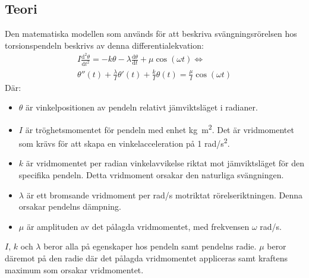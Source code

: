 \documentclass[12pt, a4paper]{article}
\begin{document}
\subsection{Teori}
Den matematiska modellen som används för att beskriva svängningsrörelsen hos torsionspendeln beskrivs av denna differentialekvation:
\begin{equation}
	\begin{split}
		I\frac{\mathrm{d}^2\theta}{\mathrm{d}t^2}=-k\theta-\lambda\frac{\mathrm{d}\theta}{\mathrm{d}t}+\mu\cos(\omega t)\Leftrightarrow\\
		\theta''(t)+\frac{\lambda}{I}\theta'(t)+\frac{k}{I}\theta(t)=\frac{\mu}{I}\cos(\omega t)
	\end{split}
\end{equation}
Där: 
\begin{itemize}
	\item $\theta$ är vinkelpositionen av pendeln relativt jämviktsläget i radianer.
	\item $I$ är tröghetsmomentet för pendeln med enhet \si{kg.m^2}. Det är vridmomentet som krävs för att skapa en vinkelacceleration på 1 \si{rad/s^2}.
	\item $k$ är vridmomentet per radian vinkelavvikelse riktat mot jämviktsläget för den specifika pendeln. Detta vridmoment orsakar den naturliga svängningen.
	\item $\lambda$ är ett bromsande vridmoment per \si{rad/s} motriktat rörelseriktningen. Denna orsakar pendelns dämpning.
	\item $\mu$ är amplituden av det pålagda vridmomentet, med frekvensen $\omega$ \si{rad/s}.
\end{itemize}
$I$, $k$ och $\lambda$ beror alla på egenskaper hos pendeln samt pendelns radie. $\mu$ beror däremot på den radie där det pålagda vridmomentet appliceras samt kraftens maximum som orsakar vridmomentet.
\end{document}
